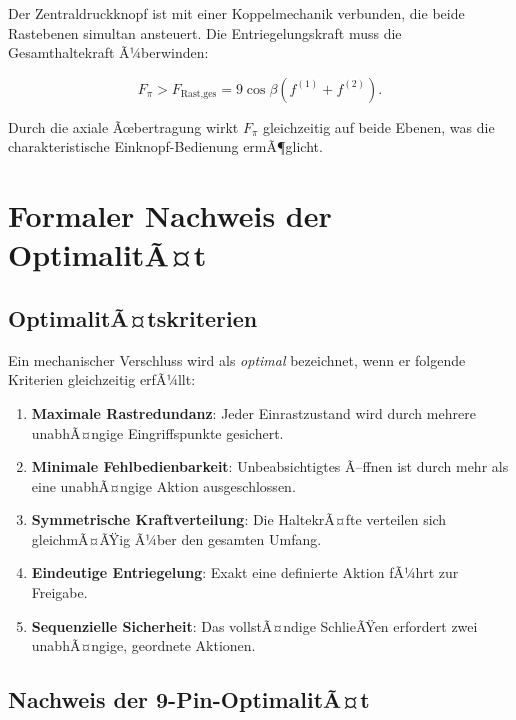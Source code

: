 ﻿\documentclass[12pt, a4paper]{article}
\theoremstyle{remark}
\begin{document}
Der Zentraldruckknopf ist mit einer Koppelmechanik verbunden, die beide Rastebenen
simultan ansteuert. Die Entriegelungskraft muss die Gesamthaltekraft Ã¼berwinden:

\begin{equation}
  F_\pi > F_{\text{Rast,ges}} = 9\cos\beta\left(f^{(1)} + f^{(2)}\right).
\end{equation}

Durch die axiale Ãœbertragung wirkt $F_\pi$ gleichzeitig auf beide Ebenen, was die
charakteristische Einknopf-Bedienung ermÃ¶glicht.

\section{Formaler Nachweis der OptimalitÃ¤t}

\subsection{OptimalitÃ¤tskriterien}

Ein mechanischer Verschluss wird als \emph{optimal} bezeichnet, wenn er folgende Kriterien
gleichzeitig erfÃ¼llt:

\begin{enumerate}[label=\textbf{K\arabic*}]
  \item \textbf{Maximale Rastredundanz}: Jeder Einrastzustand wird durch mehrere unabhÃ¤ngige
        Eingriffspunkte gesichert.
  \item \textbf{Minimale Fehlbedienbarkeit}: Unbeabsichtigtes Ã–ffnen ist durch mehr als eine
        unabhÃ¤ngige Aktion ausgeschlossen.
  \item \textbf{Symmetrische Kraftverteilung}: Die HaltekrÃ¤fte verteilen sich gleichmÃ¤ÃŸig Ã¼ber
        den gesamten Umfang.
  \item \textbf{Eindeutige Entriegelung}: Exakt eine definierte Aktion fÃ¼hrt zur Freigabe.
  \item \textbf{Sequenzielle Sicherheit}: Das vollstÃ¤ndige SchlieÃŸen erfordert zwei unabhÃ¤ngige,
        geordnete Aktionen.
\end{enumerate}

\subsection{Nachweis der 9-Pin-OptimalitÃ¤t}
\end{document}
